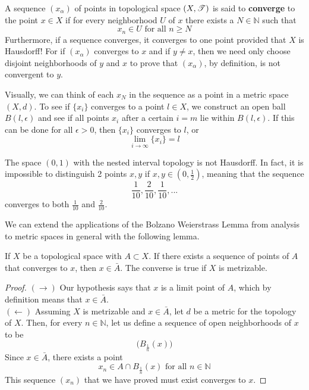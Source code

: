   \begin{definition}
  A sequence $(x_\alpha)$ of points in topological space $(X, \operatorname{\mathscr{T}})$ is said to \textbf{converge} to the point $x \in X$ if for every neighborhood $U$ of $x$ there exists a $N \in \mathbb{N}$ such that
  \[x_n \in U \text{ for all } n \geq N\]
  Furthermore, if a sequence converges, it converges to one point provided that $X$ is Hausdorff! For if $(x_\alpha)$ converges to $x$ and if $y \neq x$, then we need only choose disjoint neighborhoods of $y$ and $x$ to prove that $(x_\alpha)$, by definition, is not convergent to $y$.
  \end{definition}

  Visually, we can think of each $x_N$ in the sequence as a point in a metric space $(X, d)$. To see if $\{ x_i \}$ converges to a point $l \in X$, we construct an open ball $B(l, \epsilon)$ and see if all points $x_i$ after a certain $i = m$ lie within $B (l, \epsilon)$. If this can be done for all $\epsilon > 0$, then $\{ x_i \}$ converges to $l$, or 
  \[\lim_{i \to \infty} \{ x_i \} = l \]

  \begin{example}
  The space $(0,1)$ with the nested interval topology is not Hausdorff. In fact, it is impossible to distinguish 2 points $x, y$ if $x, y \in (0, \frac{1}{2})$, meaning that the sequence
  \[\frac{1}{10}, \frac{2}{10}, \frac{1}{10}, ...\]
  converges to both $\frac{1}{10}$ and $\frac{2}{10}$.
  \end{example} 

  We can extend the applications of the Bolzano Weierstrass Lemma from analysis to metric spaces in general with the following lemma. 

  \begin{lemma}
  If $X$ be a topological space with $A \subset X$. If there exists a sequence of points of $A$ that converges to $x$, then $x \in \bar{A}$. The converse is true if $X$ is metrizable. 
  \end{lemma}
  \begin{proof}
  $(\rightarrow)$ Our hypothesis says that $x$ is a limit point of $A$, which by definition means that $x \in \bar{A}$. \\
  $(\leftarrow)$ Assuming $X$ is metrizable and $x \in \bar{A}$, let $d$ be a metric for the topology of $X$. Then, for every $n \in \mathbb{N}$, let us define a sequence of open neighborhoods of $x$ to be
  \[\big(B_{\frac{1}{n}} (x) \big)\]
  Since $x \in \bar{A}$, there exists a point 
  \[x_n \in A \cap B_{\frac{1}{n}} (x) \text{ for all } n \in \mathbb{N}\]
  This sequence $(x_n)$ that we have proved must exist converges to $x$. 
  \end{proof}

